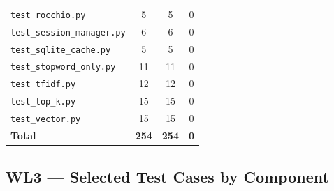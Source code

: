 \documentclass[12pt]{article}
\begin{document}
\begin{table}[H]
\begin{tabular}{|l|c|c|c|}
\texttt{test\_rocchio.py}            & 5              & 5               & 0 \\
\texttt{test\_session\_manager.py}   & 6              & 6               & 0 \\
\texttt{test\_sqlite\_cache.py}      & 5              & 5               & 0 \\
\texttt{test\_stopword\_only.py}     & 11             & 11              & 0 \\
\texttt{test\_tfidf.py}              & 12             & 12              & 0 \\
\texttt{test\_top\_k.py}             & 15             & 15              & 0 \\
\texttt{test\_vector.py}             & 15             & 15              & 0 \\
\hline
\textbf{Total}                       & \textbf{254}   & \textbf{254}    & \textbf{0} \\
\hline
\end{tabular}
\end{table}

\subsection*{WL3 --- Selected Test Cases by Component}
\end{document}
